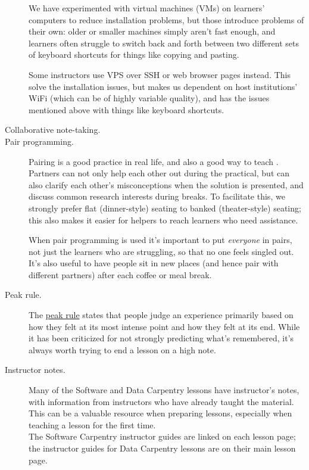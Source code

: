 \begin{description}
We have experimented with virtual machines (VMs) on learners' computers
to reduce installation problems, but those introduce problems of their
own: older or smaller machines simply aren't fast enough, and learners
often struggle to switch back and forth between two different sets of
keyboard shortcuts for things like copying and pasting.

Some instructors use VPS over SSH or web browser pages instead. This
solve the installation issues, but makes us dependent on host
institutions' WiFi (which can be of highly variable quality), and has
the issues mentioned above with things like keyboard shortcuts.

\item[Collaborative note-taking.]

\item[Pair programming.]
Pairing is a good practice in real life, and also a
good way to teach \cite{bib:porter-what-works}. Partners can not only help each other out during the
practical, but can also clarify each other's misconceptions when the
solution is presented, and discuss common research interests during
breaks. To facilitate this, we strongly prefer flat (dinner-style)
seating to banked (theater-style) seating; this also makes it easier for
helpers to reach learners who need assistance.

When pair programming is used it's important to put \emph{everyone} in
pairs, not just the learners who are struggling, so that no one feels
singled out. It's also useful to have people sit in new places (and
hence pair with different partners) after each coffee or meal break.
\item[Peak rule.]
The \href{https://en.wikipedia.org/wiki/Peak\%E2\%80\%93end\_rule}{peak
rule} states that people judge an experience primarily based on how they
felt at its most intense point and how they felt at its end. While it
has been criticized for not strongly predicting what's remembered, it's
always worth trying to end a lesson on a high note.
\item[Instructor notes.]
Many of the Software and Data Carpentry lessons have instructor's notes,
with information from instructors who have already taught the material.
This can be a valuable resource when preparing lessons, especially when
teaching a lesson for the first time.\\The Software Carpentry instructor
guides are linked on each lesson page; the instructor guides for Data
Carpentry lessons are on their
main lesson page.
\end{description}

